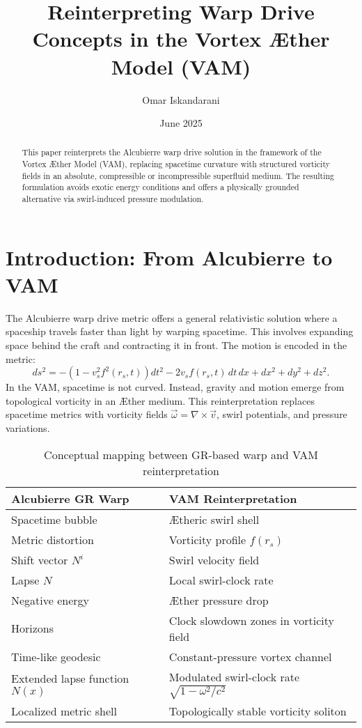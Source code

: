 \documentclass[12pt]{article}
\title{Reinterpreting Warp Drive Concepts in the Vortex \AE{}ther Model (VAM)}
\author{Omar Iskandarani}
\date{June 2025}
\begin{document}
\maketitle

\begin{abstract}
This paper reinterprets the Alcubierre warp drive solution in the framework of the Vortex \AE{}ther Model (VAM), replacing spacetime curvature with structured vorticity fields in an absolute, compressible or incompressible superfluid medium. The resulting formulation avoids exotic energy conditions and offers a physically grounded alternative via swirl-induced pressure modulation.
\end{abstract}

\section{Introduction: From Alcubierre to VAM}
The Alcubierre warp drive metric \cite{alcubierre1994warp} offers a general relativistic solution where a spaceship travels faster than light by warping spacetime. This involves expanding space behind the craft and contracting it in front. The motion is encoded in the metric:
\begin{equation}
    ds^2 = -\left(1 - v_s^2 f^2(r_s, t)\right)dt^2 - 2 v_s f(r_s, t)\,dt\,dx + dx^2 + dy^2 + dz^2.
\end{equation}
In the VAM, spacetime is not curved. Instead, gravity and motion emerge from topological vorticity in an \AE{}ther medium. This reinterpretation replaces spacetime metrics with vorticity fields \( \vec{\omega} = \nabla \times \vec{v} \), swirl potentials, and pressure variations.



\begin{table}[H]
    \centering
    \footnotesize
    \renewcommand{\arraystretch}{1.3}
    \begin{tabular}{|l|l|}
        \hline
        \textbf{Alcubierre GR Warp} & \textbf{VAM Reinterpretation} \\
        \hline
        Spacetime bubble & \AE{}theric swirl shell \\
        Metric distortion & Vorticity profile $f(r_s)$ \\
        Shift vector $N^i$ & Swirl velocity field \\
        Lapse $N$ & Local swirl-clock rate \\
        Negative energy & \AE{}ther pressure drop \\
        Horizons & Clock slowdown zones in vorticity field \\
        Time-like geodesic & Constant-pressure vortex channel \\
        Extended lapse function $N(x)$ & Modulated swirl-clock rate $\sqrt{1 - \omega^2/c^2}$ \\
        Localized metric shell & Topologically stable vorticity soliton \\
        \hline
    \end{tabular}
    \caption{Conceptual mapping between GR-based warp and VAM reinterpretation}
\end{table}
\end{document}
